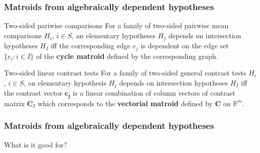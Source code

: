 \documentclass[bigger]{beamer}
\newcommand{\bs}[1]{\bm{#1}}
\newcommand{\ie}{{\sl i.e.},~}
\providecommand{\alert}[1]{\textbf{#1}}
\begin{document}
\begin{frame}
\frametitle{Matroids from algebraically dependent hypotheses}

 \begin{block}{Two-sided pariwise comparisons}
   For a family of two-sided pairwise mean comparisons $H_i$, $i \in
   S$, an elementary hypotheses $H_j$ depends on intersection
   hypotheses $H_I$ iff the corresponding edge $e_j$ is dependent on
   the edge set $\{e_i:i \in I\}$ of the \alert{cycle matroid} defined by
   the corresponding graph.
 \end{block}

 \begin{block}{Two-sided linear contrast tests}
   For a family of two-sided general contrast tests $H_i$, $i \in S$,
   an elementary hypothesis $H_j$ depends on intersection hypotheses
   $H_I$ iff the contrast vector $\bs{c_j}$ is a linear combination of
   column vectors of contrast matrix $\bs{C}_I$ which corresponds to
   the \alert{vectorial matroid} defined by $\bs{C}$ on $\mathbb{R}^m$.
 \end{block}

\end{frame}


\begin{frame}
 \frametitle{Matroids from algebraically dependent hypotheses}
 {\Large What is it good for?\\
 }
\end{frame}




\end{document}
